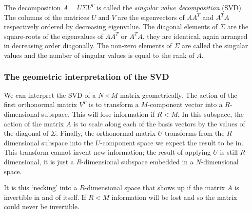 \documentclass[a4paper]{article}
\newcommand{\highlight}[1]{{\color{blue}#1}}
\begin{document}
The decomposition $A = U \Sigma V^T$ is called the \emph{singular value
decomposition} (SVD). \highlight{The columns of the matrices $U$ and $V$ are the
eigenvectors of $AA^T$ and $A^TA$ respectively} ordered by decreasing
eigenvalue. \highlight{The diagonal elements of $\Sigma$ are the square-roots of
the eigenvalues of $AA^T$ or $A^TA$}, they are identical, again arranged in
decreasing order diagonally. The non-zero elements of $\Sigma$ are called the
singular values and \highlight{the number of singular values is equal to the
rank of $A$}.

\subsubsection{The geometric interpretation of the SVD}

We can interpret the SVD of a $N \times M$ matrix geometrically. The action of
the first orthonormal matrix $V^T$ is to transform a $M$-component vector into a
$R$-dimensional subspace. This will lose information if $R < M$. In this
subspace, the action of the matrix $A$ is to scale along each of the basis
vectors by the values of the diagonal of $\Sigma$. Finally, the orthonormal
matrix $U$ transforms from the $R$-dimensional subspace into the $U$-component
space we expect the result to be in. This transform cannot invent new
information; the result of applying $U$ is still $R$-dimensional, it is just a
$R$-dimensional subspace embedded in a $N$-dimensional space.

It is this `necking' into a $R$-dimensional space that shows up if the matrix
$A$ is invertible in and of itself. If $R < M$ information will be lost and so
the matrix could never be invertible.
\end{document}
